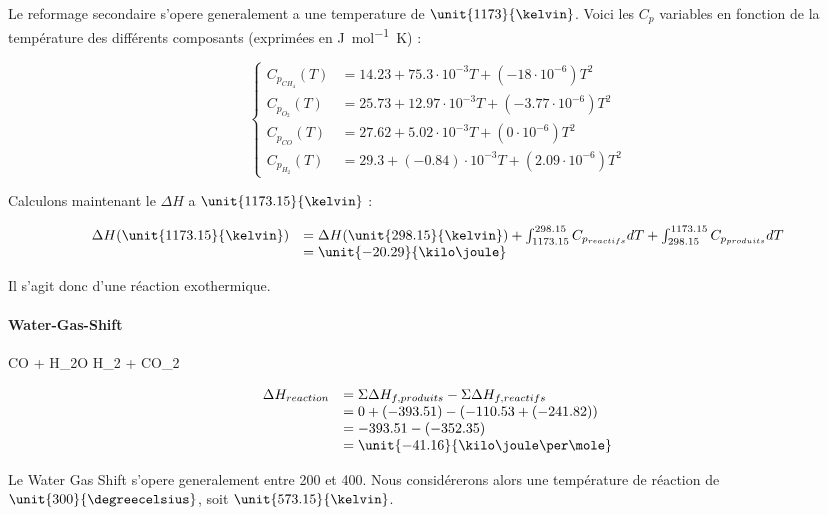 Le reformage secondaire s'opere generalement a une temperature de $\unit{1173}{\kelvin}$.
Voici les $C_p$ variables en fonction de la température des différents composants\cite{hc-table} 
(exprimées en \unit{\joule\per\mole\kelvin}) :

$$
	\left\{
		\begin{array}{rl}
			C_{p_{CH_4}}(T) 	&= 14.23 + 75.3\cdot10^{-3}T + (-18\cdot10^{-6})T^2 \\
			C_{p_{O_2}}(T) 		&= 25.73 + 12.97\cdot10^{-3}T + (-3.77\cdot10^{-6})T^2 \\
			C_{p_{CO}}(T) 		&= 27.62 + 5.02\cdot10^{-3}T + (0\cdot10^{-6})T^2 \\
			C_{p_{H_2}}(T) 		&= 29.3 + (-0.84)\cdot10^{-3}T + (2.09\cdot10^{-6})T^2
		\end{array}
	\right.
$$

Calculons maintenant le $\Delta H$ a $\unit{1173.15}{\kelvin}$ :

$$
	\begin{array}{rl}
		 	\Delta H(\unit{1173.15}{\kelvin}) &=  \Delta H(\unit{298.15}{\kelvin}) 
																						+ \int_{1173.15}^{298.15} C_{p_{reactifs}} dT + \int_{298.15}^{1173.15} 
																						C_{p_{produits}} dT \\
																				&=  \unit{-20.29}{\kilo\joule}
	\end{array}
$$	

Il s'agit donc d'une réaction exothermique.

\paragraph{Water-Gas-Shift}

\begin{chemmath}
		CO + H_2O \Longrightarrow H_2 + CO_2
\end{chemmath}	

$$
	\begin{array}{rl}
	\Delta H_{reaction}		&= \Sigma \Delta H_{f,produits} - \Sigma \Delta H_{f,reactifs} \\
												&= 0 + (-393.51) - (-110.53 + (-241.82)) \\
												&= -393.51 - (-352.35) \\
												&= \unit{-41.16}{\kilo\joule\per\mole}
	\end{array}
$$

Le Water Gas Shift s'opere generalement entre 200 et \unit{400}{\degreecelsius}. Nous considérerons
alors une température de réaction de $\unit{300}{\degreecelsius}$, soit $\unit{573.15}{\kelvin}$.
						
